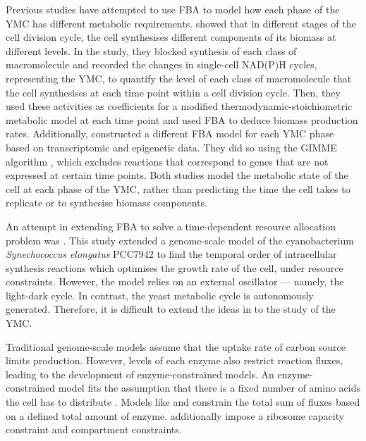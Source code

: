 Previous studies have attempted to use FBA to model how each phase of the YMC has different metabolic requirements.
\textcite{takhaveevTemporalSegregationBiosynthetic2023} showed that in different stages of the cell division cycle, the cell synthesises different components of its biomass at different levels.
In the study, they blocked synthesis of each class of macromolecule and recorded the changes in single-cell NAD(P)H cycles, representing the YMC, to quantify the level of each class of macromolecule that the cell synthesises at each time point within a cell division cycle.
Then, they used these activities as coefficients for a modified thermodynamic-stoichiometric metabolic model at each time point and used FBA to deduce biomass production rates.
Additionally, \textcite{cesurGenomeWideAnalysisYeast} constructed a different FBA model for each YMC phase based on transcriptomic and epigenetic data.
They did so using the GIMME algorithm \parencite{beckerContextSpecificMetabolicNetworks2008}, which excludes reactions that correspond to genes that are not expressed at certain time points.
Both studies model the metabolic state of the cell at each phase of the YMC, rather than predicting the time the cell takes to replicate or to synthesise biomass components.

An attempt in extending FBA to solve a time-dependent resource allocation problem was \textcite{reimersCellularTradeoffsOptimal2017}.
This study extended a genome-scale model of the cyanobacterium \textit{Synechococcus elongatus} PCC7942 to find the temporal order of intracellular synthesis reactions which optimises the growth rate of the cell, under resource constraints.
However, the model relies on an external oscillator --- namely, the light-dark cycle.
In contrast, the yeast metabolic cycle is autonomously generated.
Therefore, it is difficult to extend the ideas in \textcite{reimersCellularTradeoffsOptimal2017} to the study of the YMC.

Traditional genome-scale models assume that the uptake rate of carbon source limits production.
However, levels of each enzyme also restrict reaction fluxes, leading to the development of enzyme-constrained models.
An enzyme-constrained model fits the assumption that there is a fixed number of amino acids the cell has to distribute \parencite{weisseMechanisticLinksCellular2015}.
Models like \textcite{sanchezImprovingPhenotypePredictions2017} and \textcite{elsemmanWholecellModelingYeast2022} constrain the total sum of fluxes based on a defined total amount of enzyme.
\textcite{elsemmanWholecellModelingYeast2022} additionally impose a ribosome capacity constraint and compartment constraints.

